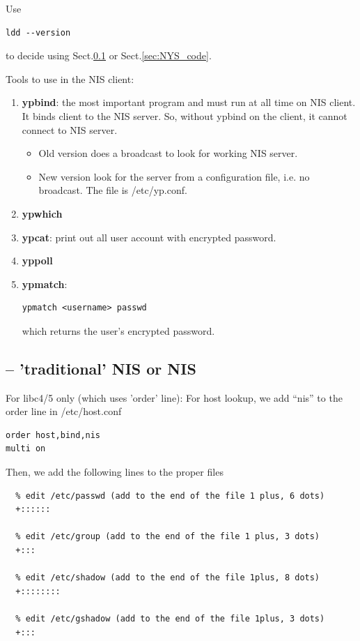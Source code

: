 Use 
\begin{verbatim}
ldd --version
\end{verbatim}
to decide using Sect.\ref{sec:traditional_NIS} or Sect.\ref{sec:NYS_code}.

Tools to use in the NIS client:
\begin{enumerate}
  \item {\bf ypbind}: the most important program and must run at all time on
  NIS client. It binds client to the NIS server. So, without ypbind on the
  client, it cannot connect to NIS server.
  \begin{itemize}
    \item Old  version does a broadcast to look for working NIS server. 
    \item New version look for the server from a configuration file, i.e. no
  broadcast. The file is /etc/yp.conf.
  \end{itemize}
  
  \item {\bf ypwhich}
  
  \item {\bf ypcat}: print out all user account with encrypted password. 
  
  \item {\bf yppoll}
  
  \item {\bf ypmatch}:
\begin{verbatim}
ypmatch <username> passwd
\end{verbatim}  
which returns the user's encrypted password.

\end{enumerate}


\subsection{-- 'traditional' NIS or NIS}
\label{sec:traditional_NIS}

For libc4/5 only (which uses 'order' line): For host lookup, we add ``nis'' to
the order line in /etc/host.conf
\begin{verbatim}
order host,bind,nis
multi on
\end{verbatim}

Then, we add the following lines to the proper files   
  \begin{verbatim}
  % edit /etc/passwd (add to the end of the file 1 plus, 6 dots)
  +::::::
  
  % edit /etc/group (add to the end of the file 1 plus, 3 dots)
  +:::
  
  % edit /etc/shadow (add to the end of the file 1plus, 8 dots)
  +::::::::

  % edit /etc/gshadow (add to the end of the file 1plus, 3 dots)
  +:::

  \end{verbatim}
  

